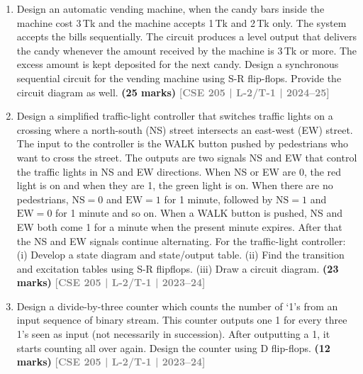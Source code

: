 \documentclass[12pt,a3paper]{article}
\newcommand{\yr}[1]{\hfill\textcolor{gray}{\small\textbf{[#1]}}}
\newcommand{\mk}[1]{\textcolor{orange!70!black}{\small\textbf{(#1 marks)}}}
\begin{document}
\begin{enumerate}

\item Design an automatic vending machine, when the candy bars inside the machine cost 3\,Tk and the machine accepts 1\,Tk and 2\,Tk only. The system accepts the bills sequentially. The circuit produces a level output that delivers the candy whenever the amount received by the machine is 3\,Tk or more. The excess amount is kept deposited for the next candy. Design a synchronous sequential circuit for the vending machine using S-R flip-flops. Provide the circuit diagram as well.
\mk{25} \yr{CSE 205 | L-2/T-1 | 2024--25}

\item Design a simplified traffic-light controller that switches traffic lights on a crossing where a north-south (NS) street intersects an east-west (EW) street. The input to the controller is the WALK button pushed by pedestrians who want to cross the street. The outputs are two signals NS and EW that control the traffic lights in NS and EW directions. When NS or EW are 0, the red light is on and when they are 1, the green light is on. When there are no pedestrians, $\text{NS}=0$ and $\text{EW}=1$ for 1 minute, followed by $\text{NS}=1$ and $\text{EW}=0$ for 1 minute and so on. When a WALK button is pushed, NS and EW both come 1 for a minute when the present minute expires. After that the NS and EW signals continue alternating. For the traffic-light controller:
	(i) Develop a state diagram and state/output table.
	(ii) Find the transition and excitation tables using S-R flipflops.
	(iii) Draw a circuit diagram.
  \mk{23} \yr{CSE 205 | L-2/T-1 | 2023--24}

\item Design a divide-by-three counter which counts the number of `1's from an input sequence of binary stream. This counter outputs one 1 for every three 1's seen as input (not necessarily in succession). After outputting a 1, it starts counting all over again. Design the counter using D flip-flops.
\mk{12} \yr{CSE 205 | L-2/T-1 | 2023--24}

\end{enumerate}
\end{document}
